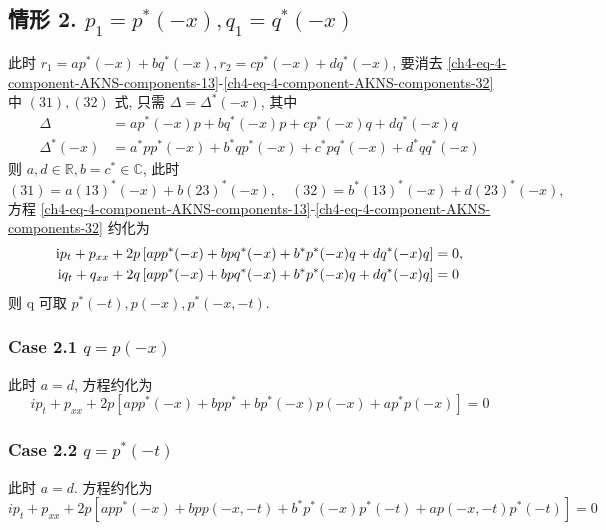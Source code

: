 \subsection*{情形 2. $ p_1 = p^{*}(-x), q_1 = q^{*}(-x) $}
此时 $ r_1 = ap^{*}(-x) + bq^{*}(-x), r_2 = cp^{*}(-x) + dq^{*}(-x) $, 要消去 \eqref{ch4-eq-4-component-AKNS-components-13}-\eqref{ch4-eq-4-component-AKNS-components-32} 中 $(31), (32)$ 式, 只需 $ \Delta = \Delta^{*}(-x) $, 其中
\begin{align}
    \Delta         & = ap^{*}(-x)p + bq^{*}(-x)p + c p^{*}(-x)q + dq^{*}(-x)q                \\
    \Delta^{*}(-x) & = a^{*}pp^{*}(-x) + b^{*}qp^{*}(-x) + c^{*}pq^{*}(-x) + d^{*}qq^{*}(-x)
\end{align}
则 $ a,d \in \mathbb{R}, b = c^{*} \in \mathbb{C} $, 此时
\begin{equation}
    (31) = a(13)^{*}(-x) + b(23)^{*}(-x), \quad
    (32) = b^{*}(13)^{*}(-x) + d(23)^{*}(-x),
\end{equation}
方程 \eqref{ch4-eq-4-component-AKNS-components-13}-\eqref{ch4-eq-4-component-AKNS-components-32} 约化为
\begin{align}
    \mathrm{i} p_{t} + p_{xx} + 2p \left[ a p p^{*}(-x) + b p q^{*}(-x) + b^{*}p^{*}(-x)q + d q^{*}(-x) q \right] & = 0, \label{ch4-eq-reduction-inverse-x-p} \\
    \mathrm{i} q_{t} + q_{xx} + 2q \left[ a p p^{*}(-x) + b p q^{*}(-x) + b^{*}p^{*}(-x)q + d q^{*}(-x) q \right] & = 0\label{ch4-eq-reduction-inverse-x-q}
\end{align}
则 q 可取 $ p^{*}(-t), p(-x), p^{*}(-x,-t) $.

\subsubsection*{Case 2.1 $ q = p(-x) $}
此时 $ a=d $, 方程约化为
\begin{equation}
    ip_t + p_{xx} + 2p \left[ app^{*}(-x) + bpp^{*} + bp^{*}(-x)p(-x) + ap^{*}p(-x) \right] = 0
\end{equation}

\subsubsection*{Case 2.2 $q = p^{*}(-t)$}
此时 $ a = d $. 方程约化为
\begin{equation}
    ip_t + p_{xx} + 2p \left[ app^{*}(-x) + bpp(-x,-t) + b^{*}p^{*}(-x)p^{*}(-t) + ap(-x,-t)p^{*}(-t) \right] = 0
\end{equation}

